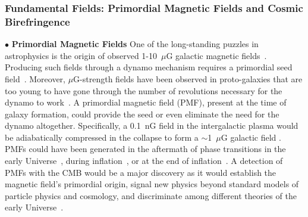 \documentclass[PICOReport.tex]{subfiles}
\begin{document}


\subsubsection{Fundamental Fields: Primordial Magnetic Fields and Cosmic Birefringence}

$\bullet$ {\bf Primordial Magnetic Fields} \hspace{0.1in} One of the long-standing puzzles in astrophysics is the origin of observed 1-10~$\mu$G galactic magnetic fields~\citep{Widrow:2002ud}. Producing such fields through a dynamo mechanism requires a primordial seed field~\citep{Widrow:2011hs}. Moreover, $\mu$G-strength fields have been observed in proto-galaxies that are too young to have gone through the number of revolutions necessary for the dynamo to work~\citep{Athreya:1998}. A primordial magnetic field (PMF), present at the time of galaxy formation, could provide the seed or even eliminate the need for the dynamo altogether. Specifically, a 0.1~nG field in the intergalactic plasma would be adiabatically compressed in the collapse to form a $\sim$1~$\mu$G galactic field \citep{Grasso:2000wj}.
PMFs could have been generated in the aftermath of phase transitions in the early Universe~\citep{Vachaspati:1991nm}, during inflation~\cite{Turner:1987bw,Ratra:1991bn}, or at the end of inflation~\cite{DiazGil:2007dy}. A detection of PMFs with the CMB would be a major discovery as it would establish the magnetic field's primordial origin, signal new physics beyond standard models of particle physics and cosmology, and discriminate among different theories of the early Universe~\cite{Barnaby:2012tk,Long:2013tha,Durrer:2013pga}.
\end{document}
